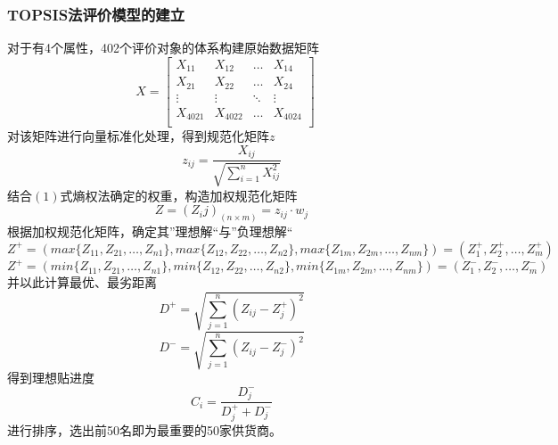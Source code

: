 \documentclass{cumcmthesis}
\begin{document}
\subsubsection*{TOPSIS法评价模型的建立}
对于有4个属性，402个评价对象的体系构建原始数据矩阵
\begin{equation}
    X=\begin{bmatrix}
        X_{11}   & X_{12}   & \dots  & X_{14}   \\
        X_{21}   & X_{22}   & \dots  & X_{24}   \\
        \vdots   & \vdots   & \ddots & \vdots   \\
        X_{4021} & X_{4022} & \dots  & X_{4024} \\
    \end{bmatrix} \quad
    \nonumber
    \label{数据矩阵}
\end{equation}
对该矩阵进行向量标准化处理，得到规范化矩阵$z$
\begin{equation}
    z_{ij}=\frac{X_{ij}}{\sqrt{\sum\limits^n_{i=1}X^2_{ij}}}\nonumber
    \label{规范化矩阵}
\end{equation}
结合$(1)$式熵权法确定的权重，构造加权规范化矩阵
\begin{equation}
    Z=(Z_ij)_{(n\times m)}=z_{ij}\cdot w_j\nonumber
    \label{加权规范化矩阵}
\end{equation}
根据加权规范化矩阵，确定其”理想解“与”负理想解“
\begin{equation}
    Z^+ = (max\{Z_{11},Z{_21},\dots,Z_{n1}\},max\{Z_{12},Z_{22},\dots,Z_{n2}\},max\{Z_{1m},Z_{2m},\dots,Z_{nm}\}) =(Z^+_1,Z^+_2,\dots,Z^+_m)\nonumber
\end{equation}
\begin{equation}
    Z^+ = (min\{Z_{11},Z{_21},\dots,Z_{n1}\},min\{Z_{12},Z_{22},\dots,Z_{n2}\},min\{Z_{1m},Z_{2m},\dots,Z_{nm}\}) =(Z^-_1,Z^-_2,\dots,Z^-_m)\nonumber
\end{equation}
并以此计算最优、最劣距离
\begin{equation}
    D^+=\sqrt{\sum_{j=1}^{n}{(Z_{ij}-Z^+_j)^2}}\nonumber
\end{equation}
\begin{equation}
    D^-=\sqrt{\sum_{j=1}^{n}{(Z_{ij}-Z^-_j)^2}}\nonumber
\end{equation}
得到理想贴进度
\begin{equation}
    C_i=\frac{D^-_j}{D^+_j+D^-_j}\nonumber
\end{equation}
进行排序，选出前50名即为最重要的50家供货商。
\end{document}
